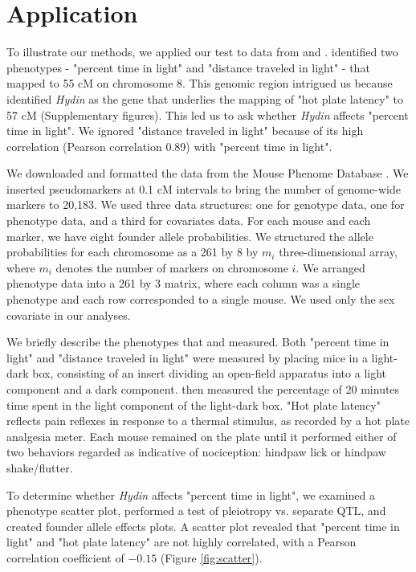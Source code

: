 \documentclass[12pt,twoside, lineno]{gsajnl}
\begin{document}
\section{Application}
\label{sec:app}

To illustrate our methods, we applied our test to data from
\citet{logan2013high} and \citet{recla2014precise}.
\citet{logan2013high} identified two phenotypes - "percent time in
light" and "distance traveled in light" - that mapped to 55 cM on
chromosome 8. This genomic region intrigued us because
\citet{recla2014precise} identified \textit{Hydin} as the gene that
underlies the mapping of "hot plate latency" to 57 cM (Supplementary
figures). This led us to ask whether \textit{Hydin} affects "percent
time in light". We ignored "distance traveled in light" because of its
high correlation (Pearson correlation 0.89) with "percent time in
light".




We downloaded and formatted the data from the Mouse Phenome Database
\citep{bogue2015collaborative}. We inserted pseudomarkers at 0.1 cM
intervals to bring the number of genome-wide markers to 20,183. We
used three data structures: one for genotype data, one for phenotype
data, and a third for covariates data. For each mouse and each marker,
we have eight founder allele probabilities. We structured the allele
probabilities for each chromosome as a 261 by 8 by $m_i$
three-dimensional array, where $m_i$ denotes the number of markers on
chromosome $i$. We arranged phenotype data into a 261 by 3 matrix,
where each column was a single phenotype and each row corresponded to
a single mouse. We used only the sex covariate in our analyses.

We briefly describe the phenotypes that \citet{logan2013high} and
\citet{recla2014precise} measured. Both "percent time in light" and
"distance traveled in light" were measured by placing mice in a
light-dark box, consisting of an insert dividing an open-field
apparatus into a light component and a dark component.
\citet{logan2013high} then measured the percentage of 20 minutes time
spent in the light component of the light-dark box. "Hot plate
latency" reflects pain reflexes in response to a thermal stimulus, as
recorded by a hot plate analgesia meter. Each mouse remained on the
plate until it performed either of two behaviors regarded as
indicative of nociception: hindpaw lick or hindpaw shake/flutter.




To determine whether \textit{Hydin} affects "percent time in light",
we examined a phenotype scatter plot, performed a test of pleiotropy
vs. separate QTL, and created founder allele effects plots. A scatter
plot revealed that "percent time in light" and "hot plate latency" are
not highly correlated, with a Pearson correlation coefficient of
$-0.15$ (Figure \ref{fig:scatter}).
\end{document}
